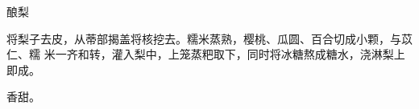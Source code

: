 \begin{recipe}{酿梨}

\ingredients


\cooking

将梨子去皮，从蒂部揭盖将核挖去。糯米蒸熟，樱桃、瓜圆、百合切成小颗，与苡仁、糯
米一齐和转，灌入梨中，上笼蒸粑取下，同时将冰糖熬成糖水，浇淋梨上即成。

\features

香甜。

\end{recipe}

